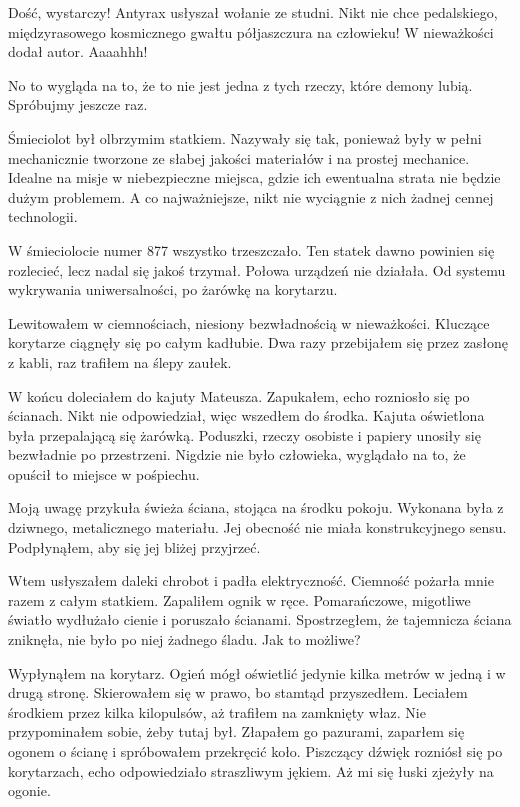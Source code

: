 \divider{}

\begin{dialogue}
\ds{} Dość, wystarczy! \dm{} Antyrax usłyszał wołanie ze studni. \dm{} Nikt nie chce pedalskiego, międzyrasowego kosmicznego gwałtu półjaszczura na człowieku!
\ds{} W nieważkości \dm{} dodał autor.
\ds{} Aaaahhh!
\end{dialogue}
No to wygląda na to, że to nie jest jedna z tych rzeczy, które demony lubią.
Spróbujmy jeszcze raz.

\divider{}

Śmieciolot był olbrzymim statkiem. 
Nazywały się tak, ponieważ były w pełni mechanicznie tworzone ze słabej jakości materiałów i na prostej mechanice.
Idealne na misje w niebezpieczne miejsca, gdzie ich ewentualna strata nie będzie dużym problemem. 
A co najważniejsze, nikt nie wyciągnie z nich żadnej cennej technologii.

W śmieciolocie numer 877 wszystko trzeszczało. 
Ten statek dawno powinien się rozlecieć, lecz nadal się jakoś trzymał.
Połowa urządzeń nie działała. Od systemu wykrywania uniwersalności, po żarówkę na korytarzu.

Lewitowałem w ciemnościach, niesiony bezwładnością w nieważkości.
Kluczące korytarze ciągnęły się po całym kadłubie.
Dwa razy przebijałem się przez zasłonę z kabli, raz trafiłem na ślepy zaułek.

W końcu doleciałem do kajuty Mateusza. 
Zapukałem, echo rozniosło się po ścianach.
Nikt nie odpowiedział, więc wszedłem do środka.
Kajuta oświetlona była przepalającą się żarówką.
Poduszki, rzeczy osobiste i papiery unosiły się bezwładnie po przestrzeni.
Nigdzie nie było człowieka, wyglądało na to, że opuścił to miejsce w pośpiechu.

Moją uwagę przykuła świeża ściana, stojąca na środku pokoju.
Wykonana była z dziwnego, metalicznego materiału.
Jej obecność nie miała konstrukcyjnego sensu.
Podpłynąłem, aby się jej bliżej przyjrzeć.

Wtem usłyszałem daleki chrobot i padła elektryczność.
Ciemność pożarła mnie razem z całym statkiem.
Zapaliłem ognik w ręce. Pomarańczowe, migotliwe światło wydłużało cienie i poruszało ścianami.
Spostrzegłem, że tajemnicza ściana zniknęła, nie było po niej żadnego śladu.
Jak to możliwe?

Wypłynąłem na korytarz.
Ogień mógł oświetlić jedynie kilka metrów w jedną i w drugą stronę.
Skierowałem się w prawo, bo stamtąd przyszedłem.
Leciałem środkiem przez kilka kilopulsów, aż trafiłem na zamknięty właz. 
Nie przypominałem sobie, żeby tutaj był. 
Złapałem go pazurami, zaparłem się ogonem o ścianę i spróbowałem przekręcić koło. 
Piszczący dźwięk rozniósł się po korytarzach, echo odpowiedziało straszliwym jękiem. 
Aż mi się łuski zjeżyły na ogonie.

